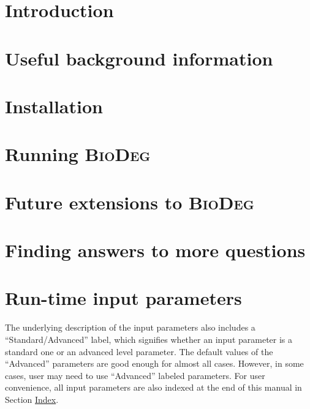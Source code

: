 \documentclass{article}
\newcommand{\biodeg}{\textsc{BioDeg}}
\begin{document}
\pagebreak

\onehalfspacing

\tableofcontents

\pagebreak

\section{Introduction}
\label{sec:intro}


\section{Useful background information}
\label{sec:background}


\section{Installation}
\label{sec:installation}


\section{Running \biodeg}
\label{sec:run}


\section{Future extensions to \biodeg}
\label{sec:future}


\section{Finding answers to more questions}
\label{sec:questions-and-answers}


\appendix

\section{Run-time input parameters}
\label{sec:parameters}
The underlying description of the input parameters also includes a ``Standard/Advanced'' label, which signifies whether an input parameter is a standard one or an advanced level parameter. The default values of the ``Advanced'' parameters are good enough for almost all cases. However, in some cases, user may need to use ``Advanced'' labeled parameters. For user convenience, all input parameters are also indexed at the end of this manual in Section \hyperref[sec:index]{Index}.



\pagebreak


\printindex[prmindexfull]
\end{document}
